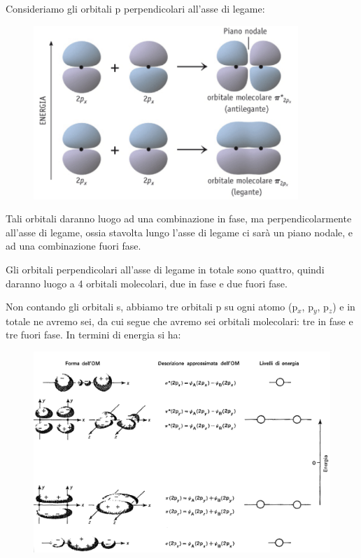 \vspace{0.2cm}Consideriamo gli orbitali p perpendicolari all'asse di legame:

\begin{figure}[htp]
    \centering
    \includegraphics[width=10cm]{immagini/orbitale_pigreco_p.png}
\end{figure}
Tali orbitali daranno luogo ad una combinazione in fase, ma perpendicolarmente all'asse di legame, ossia stavolta lungo l'asse di legame ci sarà un piano nodale, e ad una combinazione fuori fase.

Gli orbitali perpendicolari all'asse di legame in totale sono quattro, quindi daranno luogo a 4 orbitali molecolari, due in fase e due fuori fase.

Non contando gli orbitali s, abbiamo tre orbitali p su ogni atomo (p$_x$, p$_y$, p$_z$) e in totale ne avremo sei, da cui segue che avremo sei orbitali molecolari: tre in fase e tre fuori fase.
In termini di energia si ha:

\begin{figure}[htp]
    \centering
    \includegraphics[width=14cm]{immagini/equazioni_orbitali.png}
\end{figure}

